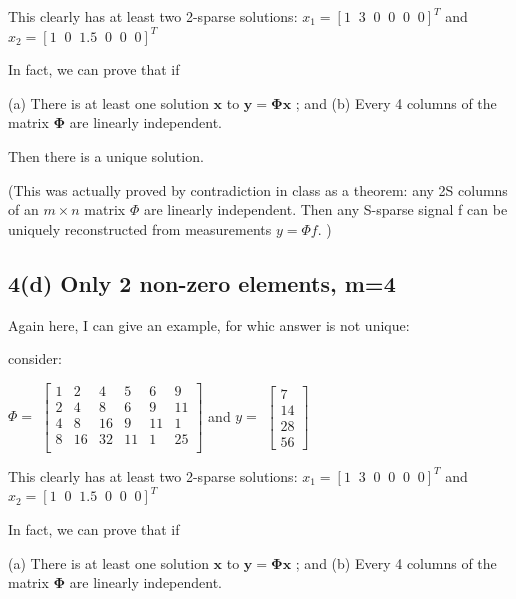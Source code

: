 \documentclass[fleqn, 11pt]{article}
\begin{document}
\medskip

This clearly has at least two 2-sparse solutions: 
$x_1=[ 1 \;\; 3 \;\;  0 \;\;  0 \;\;  0 \;\;  0 ]^T$   \; and \;
$x_2=[ 1 \;\; 0 \;\;  1.5 \;\;  0 \;\;  0 \;\;  0 ]^T$


In fact, we can prove that if 

(a) There is at least one solution $\mathbf{x}$ to $\mathbf{y=\Phi x}$ ; \;\; and
(b) Every 4 columns of the matrix  $\mathbf{\Phi}$ are linearly independent. 

Then there is a unique solution. 

(This was actually proved by contradiction in class as a theorem: any 2S columns of an $m \times n$ matrix $\Phi$ are linearly independent. Then
any S-sparse signal f can be uniquely
reconstructed from measurements $y= \Phi f$. )

\newpage

\subsection*{4(d) Only 2 non-zero elements, m=4}

Again here, I can give an example, for whic answer is not unique: 

consider: 

$ \Phi = $  $\begin{bmatrix}
    1 & 2 & 4 & 5 & 6 & 9\\
    2 & 4 & 8 & 6 & 9 & 11\\
    4 & 8 & 16 & 9 & 11 & 1\\
    8 & 16 & 32 & 11 & 1 & 25\\
    \end{bmatrix} $
  and  
$    y= $  $\begin{bmatrix}
    7 \\
    14 \\
    28 \\
    56
    \end{bmatrix}$
    
\medskip


This clearly has at least two 2-sparse solutions: 
$x_1=[ 1 \;\; 3 \;\;  0 \;\;  0 \;\;  0 \;\;  0 ]^T$   \; and \;
$x_2=[ 1 \;\; 0 \;\;  1.5 \;\;  0 \;\;  0 \;\;  0 ]^T$



In fact, we can prove that if 

(a) There is at least one solution $\mathbf{x}$ to $\mathbf{y=\Phi x}$ ; \;\; and
(b) Every 4 columns of the matrix  $\mathbf{\Phi}$ are linearly independent. 
\end{document}
